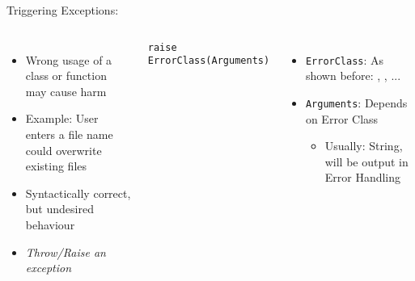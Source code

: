 
\begin{frame}[fragile]{Triggering Exceptions: }
%
\begin{columns}[T]
\begin{itemize}
\item Wrong usage of a class or function may cause harm
\item Example: User enters a file name\\
	\Thus could overwrite existing files
\item Syntactically correct, but undesired behaviour
\item[\Thus] \emph{Throw/Raise an exception}
\end{itemize}
%
\vspace{-6pt}
\begin{codebox}
\begin{verbatim}
raise ErrorClass(Arguments)
\end{verbatim}
\end{codebox}
%
\begin{itemize}
\item \texttt{ErrorClass}: As shown before: , , ...
\item \texttt{Arguments}: Depends on Error Class
	\begin{itemize}
	\item Usually: String, will be output in Error Handling
	\end{itemize}
\end{itemize}
\end{columns}
%
\end{frame}


